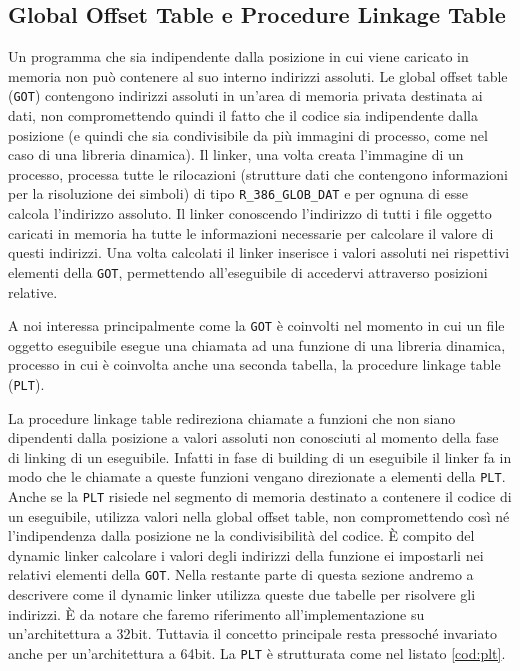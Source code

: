 \subsection{Global Offset Table e Procedure Linkage Table}
\label{sec:got}

Un programma che sia indipendente dalla posizione in cui viene
caricato in memoria non può contenere al suo interno indirizzi
assoluti. Le global offset table (\lstinline{GOT}) contengono
indirizzi assoluti in un'area di memoria privata destinata ai dati,
non compromettendo quindi il fatto che il codice sia indipendente
dalla posizione (e quindi che sia condivisibile da più immagini di
processo, come nel caso di una libreria dinamica). Il linker, una
volta creata l'immagine di un processo, processa tutte le rilocazioni
(strutture dati che contengono informazioni per la risoluzione dei
simboli) di tipo \lstinline{R_386_GLOB_DAT} e per ognuna di esse
calcola l'indirizzo assoluto. Il linker conoscendo l'indirizzo di
tutti i file oggetto caricati in memoria ha tutte le informazioni
necessarie per calcolare il valore di questi indirizzi. Una volta
calcolati il linker inserisce i valori assoluti nei rispettivi
elementi della \lstinline{GOT}, permettendo all'eseguibile di
accedervi attraverso posizioni relative.

A noi interessa principalmente come la \lstinline{GOT} è coinvolti nel
momento in cui un file oggetto eseguibile esegue una chiamata ad una
funzione di una libreria dinamica, processo in cui è coinvolta anche
una seconda tabella, la procedure linkage table (\lstinline{PLT}).

La procedure linkage table redireziona chiamate a funzioni che non
siano dipendenti dalla posizione a valori assoluti non conosciuti al
momento della fase di linking di un eseguibile. Infatti in fase di
building di un eseguibile il linker fa in modo che le chiamate a
queste funzioni vengano direzionate a elementi della
\lstinline{PLT}. Anche se la \lstinline{PLT} risiede nel segmento di
memoria destinato a contenere il codice di un eseguibile, utilizza
valori nella global offset table, non compromettendo così né
l'indipendenza dalla posizione ne la condivisibilità del codice. È
compito del dynamic linker calcolare i valori degli indirizzi della
funzione ei impostarli nei relativi elementi della
\lstinline{GOT}. Nella restante parte di questa sezione andremo a
descrivere come il dynamic linker utilizza queste due tabelle per
risolvere gli indirizzi. È da notare che faremo riferimento
all'implementazione su un'architettura a 32bit. Tuttavia il concetto
principale resta pressoché invariato anche per un'architettura a
64bit. La \lstinline{PLT} è strutturata come nel listato
\ref{cod:plt}.

